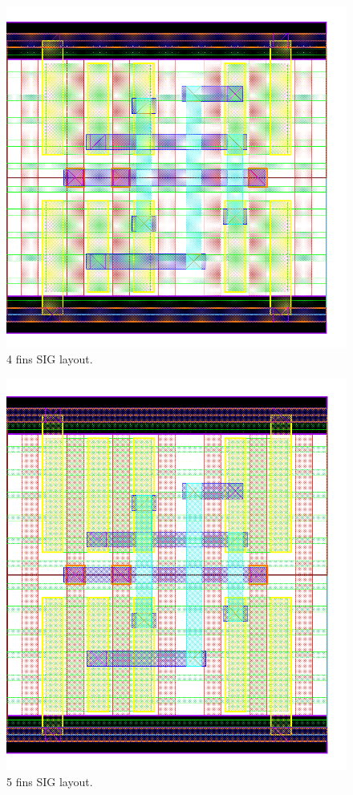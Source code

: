 \documentclass[pgmicro,mestrado,english]{iiufrgs}
\begin{document}
\begin{figure}[]
\centering
\includegraphics[width=\textwidth,height=\textheight,keepaspectratio]{SIG4F.png}
\caption{4 fins SIG layout.}
\label{fig:SIG4F}
\end{figure}

\begin{figure}[]
\centering
\includegraphics[width=\textwidth,height=\textheight,keepaspectratio]{SIG5F.png}
\caption{5 fins SIG layout.}
\label{fig:SIG5F}
\end{figure}
\end{document}
